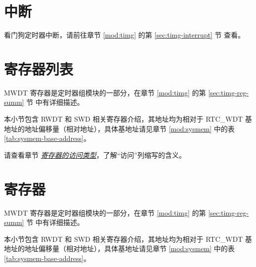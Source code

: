 \documentclass[main\_\_CN.tex]{subfiles}
\begin{document}

\section{中断}

看门狗定时器中断，请前往章节 \ref{mod:timg} \textit{} 的第 \ref{sec:timg-interrupt} 节 \textit{} 查看。




\newpage
\hypertarget{wdt-reg-summ}{}
\section{寄存器列表}
\label{sec:wdt-reg-summ}

MWDT 寄存器是定时器组模块的一部分，在章节 \ref{mod:timg} \textit{} 的第 \ref{sec:timg-reg-summ} 节 \textit{} 中有详细描述。


本小节包含 RWDT 和 SWD 相关寄存器介绍，其地址均为相对于 RTC\_WDT 基地址的地址偏移量（相对地址），具体基地址请见章节 \ref{mod:sysmem} \textit{} 中的表 \ref{tab:sysmem-base-address}。

请查看章节 \hyperref[glossary-access-types]{\textit{寄存器的访问类型}}，了解“访问”列缩写的含义。







\newpage
\section{寄存器}

MWDT 寄存器是定时器组模块的一部分，在章节 \ref{mod:timg} \textit{} 的第 \ref{sec:timg-reg-summ} 节 \textit{} 中有详细描述。


本小节包含 RWDT 和 SWD 相关寄存器介绍，其地址均为相对于 RTC\_WDT 基地址的地址偏移量（相对地址），具体基地址请见章节 \ref{mod:sysmem} \textit{} 中的表 \ref{tab:sysmem-base-address}。



\end{document}
